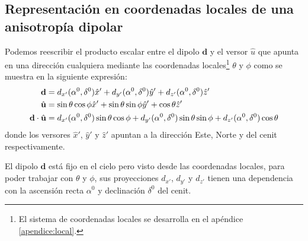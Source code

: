 \subsection{Representación en coordenadas locales de una anisotropía dipolar}

Podemos reescribir el producto escalar entre el dipolo $\textbf{d}$ y el versor $\hat{u}$ que apunta en una dirección cualquiera mediante las coordenadas locales\footnote{El sistema de coordenadas locales se desarrolla en el apéndice \ref{apendice:local}.}  $\theta$ y $\phi$ como se muestra en la siguiente expresión: 
\begin{align}
    \textbf{d} &=  d_{x'}(\alpha^0, \delta^0)\hat{x}' +  d_{y'}(\alpha^0, \delta^0)\hat{y}'+ d_{z'}(\alpha^0, \delta^0)\hat{z}' \\
    \hat{\bf{u}} &=\sin\theta \cos\phi \hat{x}' + \sin\theta \sin\phi \hat{y}' + \cos\theta\hat{z}'\\
    \textbf{d}\cdot\hat{\bf{u}} &= d_{x'}(\alpha^0, \delta^0)\sin\theta \cos\phi
    + d_{y'}(\alpha^0, \delta^0) \sin\theta \sin\phi  
     + d_{z'}(\alpha^0, \delta^0)\cos\theta \label{eq:dot-prod-local}
\end{align}
donde los versores $\hat{x}'$, $\hat{y}'$ y $\hat{z}'$ apuntan a la dirección Este, Norte y del cenit respectivamente. 

El dipolo $\textbf{d}$ está fijo en el cielo pero visto desde las coordenadas locales, para poder trabajar con $\theta$ y $\phi$, sus proyecciones  $d_{x'}$, $d_{y'}$ y $d_{z'}$ tienen una dependencia con la ascensión recta  $\alpha^0$ y declinación $\delta^0$ del cenit. 

